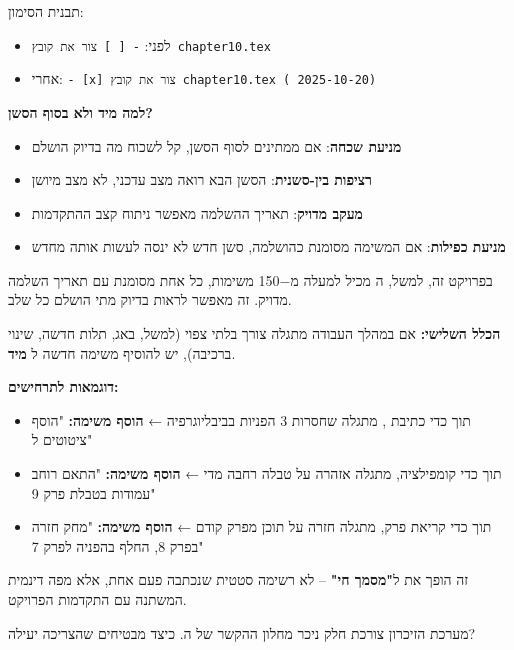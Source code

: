 תבנית הסימון:
\begin{itemize}
  \item לפני: \texttt{- [ ] צור את קובץ chapter10.tex}
  \item אחרי: \texttt{- [x] צור את קובץ chapter10.tex (\checkmark{} 2025-10-20)}
\end{itemize}

\textbf{למה מיד ולא בסוף הסשן?}
\begin{itemize}
  \item \textbf{מניעת שכחה}: אם ממתינים לסוף הסשן, קל לשכוח מה בדיוק הושלם
  \item \textbf{רציפות בין-סשנית}: הסשן הבא רואה מצב עדכני, לא מצב מיושן
  \item \textbf{מעקב מדויק}: תאריך ההשלמה מאפשר ניתוח קצב ההתקדמות
  \item \textbf{מניעת כפילות}: אם המשימה מסומנת כהושלמה, סשן חדש לא ינסה לעשות אותה מחדש
\end{itemize}

בפרויקט זה, למשל, ה מכיל למעלה מ\num{-150} משימות, כל אחת מסומנת עם תאריך השלמה מדויק. זה מאפשר לראות בדיוק מתי הושלם כל שלב.


\textbf{הכלל השלישי:} אם במהלך העבודה מתגלה צורך בלתי צפוי (למשל, באג, תלות חדשה, שינוי ברכיבה), יש להוסיף משימה חדשה ל \textbf{מיד}.

\textbf{דוגמאות לתרחישים:}
\begin{itemize}
  \item תוך כדי כתיבת , מתגלה שחסרות \num{3} הפניות בביבליוגרפיה ← \textbf{הוסף משימה:} "הוסף ציטוטים  ל"
  \item תוך כדי קומפילציה, מתגלה אזהרה על טבלה רחבה מדי ← \textbf{הוסף משימה:} "התאם רוחב עמודות בטבלת פרק \num{9}"
  \item תוך כדי קריאת פרק, מתגלה חזרה על תוכן מפרק קודם ← \textbf{הוסף משימה:} "מחק חזרה בפרק \num{8}, החלף בהפניה לפרק \num{7}"
\end{itemize}

זה הופך את  ל\textbf{"מסמך חי"} – לא רשימה סטטית שנכתבה פעם אחת, אלא מפה דינמית המשתנה עם התקדמות הפרויקט.


מערכת הזיכרון צורכת חלק ניכר מחלון ההקשר של ה. כיצד מבטיחים שהצריכה יעילה?

